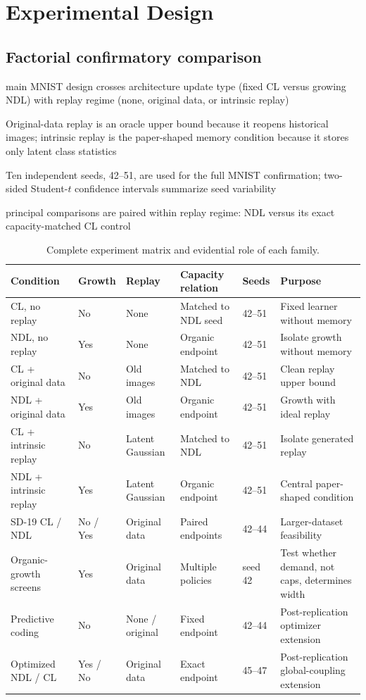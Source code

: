 \section{Experimental Design}

\subsection{Factorial confirmatory comparison}
\begin{draftpoints}
  \item main MNIST design crosses architecture update type (fixed CL versus growing NDL) with replay regime (none, original data, or intrinsic replay)
  \item Original-data replay is an oracle upper bound because it reopens historical images; intrinsic replay is the paper-shaped memory condition because it stores only latent class statistics
  \item Ten independent seeds, 42--51, are used for the full MNIST confirmation; two-sided Student-$t$ confidence intervals summarize seed variability
  \item principal comparisons are paired within replay regime: NDL versus its exact capacity-matched CL control
\end{draftpoints}

\begin{table}[htbp]
\centering
\caption{Complete experiment matrix and evidential role of each family.}
\label{tab:experiment-matrix}
\small
\begin{tabularx}{\textwidth}{p{2.7cm}p{1.4cm}p{2.1cm}p{2.4cm}p{1.5cm}Y}
\toprule
Condition & Growth & Replay & Capacity relation & Seeds & Purpose \\
\midrule
CL, no replay & No & None & Matched to NDL seed & 42--51 & Fixed learner without memory \\
NDL, no replay & Yes & None & Organic endpoint & 42--51 & Isolate growth without memory \\
CL + original data & No & Old images & Matched to NDL & 42--51 & Clean replay upper bound \\
NDL + original data & Yes & Old images & Organic endpoint & 42--51 & Growth with ideal replay \\
CL + intrinsic replay & No & Latent Gaussian & Matched to NDL & 42--51 & Isolate generated replay \\
NDL + intrinsic replay & Yes & Latent Gaussian & Organic endpoint & 42--51 & Central paper-shaped condition \\
SD-19 CL / NDL & No / Yes & Original data & Paired endpoints & 42--44 & Larger-dataset feasibility \\
Organic-growth screens & Yes & Original data & Multiple policies & seed 42 & Test whether demand, not caps, determines width \\
Predictive coding & No & None / original & Fixed endpoint & 42--44 & Post-replication optimizer extension \\
Optimized NDL / CL & Yes / No & Original data & Exact endpoint & 45--47 & Post-replication global-coupling extension \\
\bottomrule
\end{tabularx}
\end{table}

